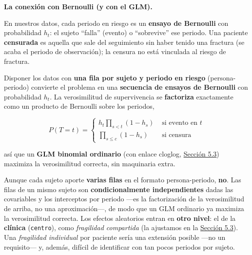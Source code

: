 \documentclass[
  letterpaper,
  DIV=11,
  numbers=noendperiod]{scrartcl}
\begin{document}
\textbf{La conexión con Bernoulli (y con el GLM).}

En nuestros datos, cada periodo en riesgo es un \textbf{ensayo de
Bernoulli} con probabilidad \(h_t\): el sujeto ``falla'' (evento) o
``sobrevive'' ese periodo. Una paciente \textbf{censurada} es aquella
que sale del seguimiento sin haber tenido una fractura (se acaba el
periodo de observación); la censura no está vinculada al riesgo de
fractura.

Disponer los datos con \textbf{una fila por sujeto y periodo en riesgo}
(persona-periodo) convierte el problema en una \textbf{secuencia de
ensayos de Bernoulli} con probabilidad \(h_t\). La verosimilitud de
supervivencia se \textbf{factoriza} exactamente como un producto de
Bernoulli sobre los periodos,

\[ P(T=t)=\begin{cases}
h_t \prod_{s<t} (1-h_s) & \text{ si evento en } t\\
\prod_{s \leq c} (1-h_s) & \text{ si censura}
\end{cases}\]

así que un \textbf{GLM binomial ordinario} (con enlace cloglog,
\protect\hyperlink{sec-u15-glm}{Sección 5.3}) maximiza la verosimilitud
correcta, sin maquinaria extra.

\begin{tcolorbox}[enhanced jigsaw, coltitle=black, rightrule=.15mm, arc=.35mm, leftrule=.75mm, colback=white, colbacktitle=quarto-callout-note-color!10!white, left=2mm, breakable, toptitle=1mm, toprule=.15mm, bottomtitle=1mm, titlerule=0mm, title=\textcolor{quarto-callout-note-color}{\faInfo}\hspace{0.5em}{¿Hace falta un efecto aleatorio por paciente?}, bottomrule=.15mm, opacityback=0, opacitybacktitle=0.6, colframe=quarto-callout-note-color-frame]

Aunque cada sujeto aporte \textbf{varias filas} en el formato
persona-periodo, \textbf{no}. Las filas de un mismo sujeto son
\textbf{condicionalmente independientes} dadas las covariables y los
interceptos por periodo ---es la factorización de la verosimilitud de
arriba, no una aproximación---, de modo que un GLM ordinario ya maximiza
la verosimilitud correcta. Los efectos aleatorios entran en \textbf{otro
nivel}: el de la \textbf{clínica} (\texttt{centro}), como
\emph{fragilidad compartida} (la ajustamos en la
\protect\hyperlink{sec-u15-glm}{Sección 5.3}). Una \emph{fragilidad
individual} por paciente sería una extensión posible ---no un
requisito--- y, además, difícil de identificar con tan pocos periodos
por sujeto.

\end{tcolorbox}
\end{document}
